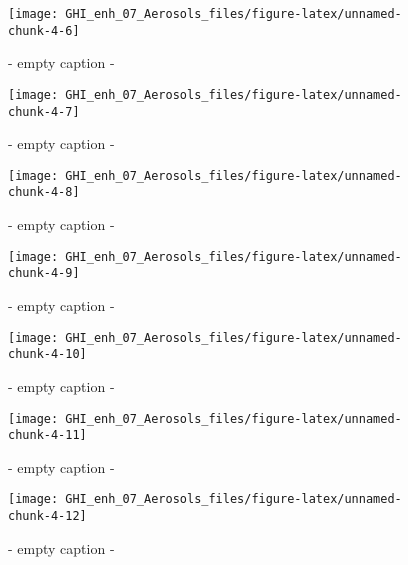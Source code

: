 \documentclass[
  10pt,
  a4paper,oneside]{article}
\begin{document}
\begin{figure}[H]

{\centering \texttt{[image: GHI\_enh\_07\_Aerosols\_files/figure-latex/unnamed-chunk-4-6]} 

}

\caption{ - empty caption - }\label{fig:unnamed-chunk-4-6}
\end{figure}
\begin{figure}[H]

{\centering \texttt{[image: GHI\_enh\_07\_Aerosols\_files/figure-latex/unnamed-chunk-4-7]} 

}

\caption{ - empty caption - }\label{fig:unnamed-chunk-4-7}
\end{figure}
\begin{figure}[H]

{\centering \texttt{[image: GHI\_enh\_07\_Aerosols\_files/figure-latex/unnamed-chunk-4-8]} 

}

\caption{ - empty caption - }\label{fig:unnamed-chunk-4-8}
\end{figure}
\begin{figure}[H]

{\centering \texttt{[image: GHI\_enh\_07\_Aerosols\_files/figure-latex/unnamed-chunk-4-9]} 

}

\caption{ - empty caption - }\label{fig:unnamed-chunk-4-9}
\end{figure}
\begin{figure}[H]

{\centering \texttt{[image: GHI\_enh\_07\_Aerosols\_files/figure-latex/unnamed-chunk-4-10]} 

}

\caption{ - empty caption - }\label{fig:unnamed-chunk-4-10}
\end{figure}
\begin{figure}[H]

{\centering \texttt{[image: GHI\_enh\_07\_Aerosols\_files/figure-latex/unnamed-chunk-4-11]} 

}

\caption{ - empty caption - }\label{fig:unnamed-chunk-4-11}
\end{figure}
\begin{figure}[H]

{\centering \texttt{[image: GHI\_enh\_07\_Aerosols\_files/figure-latex/unnamed-chunk-4-12]} 

}

\caption{ - empty caption - }\label{fig:unnamed-chunk-4-12}
\end{figure}
\end{document}
